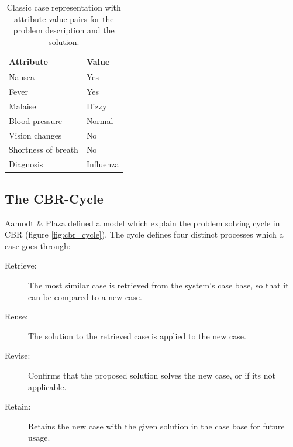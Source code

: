 \begin{table}[H]
\centering
\small
\caption{Classic case representation with attribute-value pairs for the problem description and the solution.}
\label{tab:example_case}
\begin{tabulary}{\textwidth}{|L|L|}
\hline
{} 
Attribute           & Value     \\ \hline
Nausea              & Yes       \\ \hline
Fever               & Yes       \\ \hline
Malaise             & Dizzy     \\ \hline
Blood pressure      & Normal    \\ \hline
Vision changes      & No        \\ \hline
Shortness of breath & No        \\ \hline
Diagnosis           & Influenza \\ \hline
\end{tabulary}
\end{table}

\subsection{The CBR-Cycle}\label{sec:cbr-cycle}

Aamodt & Plaza\cite{aamodt1994case} defined a model which explain the problem solving cycle in CBR (figure \ref{fig:cbr_cycle}). The cycle defines four distinct processes which a case goes through:

\begin{description}
\item [Retrieve:] The most similar case is retrieved from the system's case base, so that it can be compared to a new case.
\item [Reuse:] The solution to the retrieved case is applied to the new case.
\item [Revise:] Confirms that the proposed solution solves the new case, or if its not applicable.
\item [Retain:] Retains the new case with the given solution in the case base for future usage.
\end{description}

